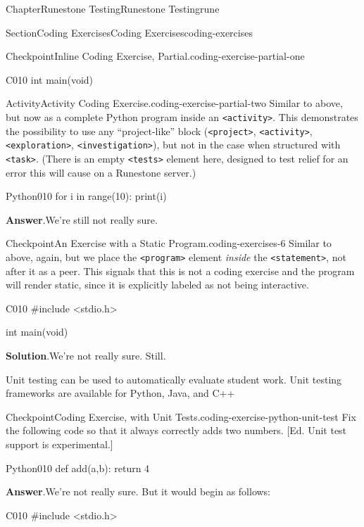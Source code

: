 \documentclass[oneside,10pt,]{book}
\newcommand{\blocktitlefont}{\relax}
\newcommand{\mono}[1]{\texttt{#1}}
\numberwithin{equation}{section}
\begin{document}
\begin{chapterptx}{Chapter}{Runestone Testing}{}{Runestone Testing}{}{}{rune}
\begin{sectionptx}{Section}{Coding Exercises}{}{Coding Exercises}{}{}{coding-exercises}
\begin{inlineexercise}{Checkpoint}{Inline Coding Exercise, Partial.}{coding-exercise-partial-one}
\begin{program}{C}{0}{1}{0}
int main(void)
\end{program}
\end{inlineexercise}%
\begin{activity}{Activity}{Activity Coding Exercise.}{coding-exercise-partial-two}%
Similar to above, but now as a complete Python program inside an \mono{<activity>}.  This demonstrates the possibility to use any ``project-like'' block (\mono{<project>}, \mono{<activity>}, \mono{<exploration>}, \mono{<investigation>}), but not in the case when structured with \mono{<task>}.  (There is an empty \mono{<tests>} element here, designed to test relief for an error this will cause on a Runestone server.)%
\begin{program}{Python}{0}{1}{0}
for i in range(10):
    print(i)
\end{program}
\par\smallskip%
\noindent\textbf{\blocktitlefont Answer}.\hypertarget{coding-exercise-partial-two-3}{}\quad{}We're still not really sure.%
\end{activity}%
\begin{inlineexercise}{Checkpoint}{An Exercise with a Static Program.}{coding-exercises-6}%
Similar to above, again, but we place the \mono{<program>} element \emph{inside} the \mono{<statement>}, not after it as a peer.  This signals that this is not a coding exercise and the program will render static, since it is explicitly labeled as not being interactive.%
\begin{program}{C}{0}{1}{0}
#include <stdio.h>

int main(void)
\end{program}
\par\smallskip%
\noindent\textbf{\blocktitlefont Solution}.\hypertarget{coding-exercises-6-3}{}\quad{}We're not really sure. Still.%
\end{inlineexercise}%
Unit testing can be used to automatically evaluate student work. Unit testing frameworks are available for Python, Java, and C++%
\begin{inlineexercise}{Checkpoint}{Coding Exercise, with Unit Tests.}{coding-exercise-python-unit-test}%
Fix the following code so that it always correctly adds two numbers. [Ed. Unit test support is experimental.]%
\begin{program}{Python}{0}{1}{0}
def add(a,b):
    return 4
\end{program}
\par\smallskip%
\noindent\textbf{\blocktitlefont Answer}.\hypertarget{coding-exercise-python-unit-test-3}{}\quad{}We're not really sure.  But it would begin as follows:%
\begin{program}{C}{0}{1}{0}
#include <stdio.h>


\end{program}
\end{inlineexercise}
\end{sectionptx}
\end{chapterptx}
\end{document}

